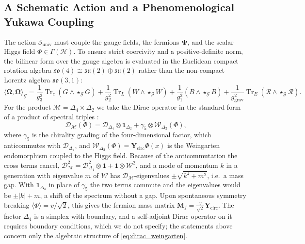 \documentclass[11pt,a4paper,reqno]{amsart}
\theoremstyle{definition}
\numberwithin{equation}{section}
\newcommand{\Tr}{\operatorname{Tr}}
\begin{document}
\subsection{A Schematic Action and a Phenomenological Yukawa Coupling}
The action $\mathcal{S}_{\mathrm{univ}}$ must couple the gauge fields, the fermions $\boldsymbol{\Psi}$, and the scalar Higgs field $\Phi \in \Gamma(\mathcal{H})$. To ensure strict coercivity and a positive-definite norm, the bilinear form over the gauge algebra is evaluated in the Euclidean compact rotation algebra $\mathfrak{so}(4) \cong \mathfrak{su}(2) \oplus \mathfrak{su}(2)$ rather than the non-compact Lorentz algebra $\mathfrak{so}(3,1)$:
\begin{equation}
    \label{eq:bilinear_form_su2}
    \langle \boldsymbol{\Omega}, \boldsymbol{\Omega} \rangle_{\mathcal{G}} = \frac{1}{g_3^2}\Tr_c(G \wedge \star_{\mathcal{G}} G) + \frac{1}{g_2^2}\Tr_L(W \wedge \star_{\mathcal{G}} W) + \frac{1}{g_1^2}(B \wedge \star_{\mathcal{G}} B) + \frac{1}{g_{\mathrm{grav}}^2}\Tr_E(\mathcal{R} \wedge \star_{\mathcal{G}} \mathcal{R}).
\end{equation}
For the product $\mathcal{M} = \Delta_4 \times \Delta_2$ we take the Dirac operator in the standard form of a product of spectral triples \cite{chamseddine2007gravity}:
\begin{equation}
    \label{eq:dirac_weingarten}
    \boldsymbol{\mathcal{D}}_{\mathcal{M}}(\Phi) = \boldsymbol{\mathcal{D}}_{\Delta_4} \otimes \mathbf{1}_{\Delta_2} + \gamma_5 \otimes \boldsymbol{\mathcal{W}}_{\Delta_2}(\Phi),
\end{equation}
where $\gamma_5$ is the chirality grading of the four-dimensional factor, which anticommutes with $\boldsymbol{\mathcal{D}}_{\Delta_4}$, and $\boldsymbol{\mathcal{W}}_{\Delta_2}(\Phi) = \mathbf{Y}_{\mathrm{circ}} \Phi(x)$ is the Weingarten endomorphism coupled to the Higgs field. Because of the anticommutation the cross terms cancel, $\boldsymbol{\mathcal{D}}_{\mathcal{M}}^2 = \boldsymbol{\mathcal{D}}_{\Delta_4}^2 \otimes \mathbf{1} + \mathbf{1} \otimes \boldsymbol{\mathcal{W}}^2$, and a mode of momentum $k$ in a generation with eigenvalue $m$ of $\boldsymbol{\mathcal{W}}$ has $\boldsymbol{\mathcal{D}}_{\mathcal{M}}$-eigenvalues $\pm\sqrt{k^2 + m^2}$, i.e.\ a mass gap. With $\mathbf{1}_{\Delta_4}$ in place of $\gamma_5$ the two terms commute and the eigenvalues would be $\pm|k| + m$, a shift of the spectrum without a gap. Upon spontaneous symmetry breaking $\langle \Phi \rangle = v / \sqrt{2}$, this gives the fermion mass matrix $\mathbf{M}_f = \frac{v}{\sqrt{2}} \mathbf{Y}_{\mathrm{circ}}$. The factor $\Delta_4$ is a simplex with boundary, and a self-adjoint Dirac operator on it requires boundary conditions, which we do not specify; the statements above concern only the algebraic structure of \eqref{eq:dirac_weingarten}.
\end{document}
